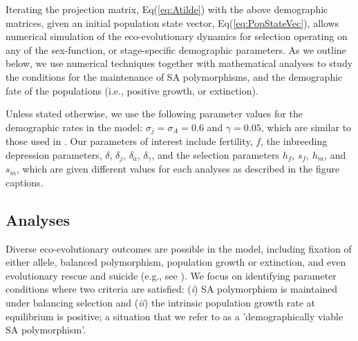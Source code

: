 \documentclass[11pt]{article}
\begin{document}
Iterating the projection matrix, Eq(\ref{eq:Atilde}) with the above demographic matrices, given an initial population state vector, Eq(\ref{eq:PopStateVec}), allows numerical simulation of the eco-evolutionary dynamics for selection operating on any of the sex-function, or stage-specific demographic parameters. As we outline below, we use numerical techniques together with mathematical analyses to study the conditions for the maintenance of SA polymorphisms, and the demographic fate of the populations (i.e., positive growth, or extinction).

Unless stated otherwise, we use the following parameter values for the demographic rates in the model: $\sigma_j = \sigma_A = 0.6$ and $\gamma = 0.05$, which are similar to those used in \citet{deVriesCaswell2019b}. Our parameters of interest include fertility, $f$, the inbreeding depression parameters, $\delta$, $\delta_j$, $\delta_a$, $\delta_{\gamma}$, and the selection parameters $h_f$, $s_f$, $h_m$, and $s_m$, which are given different values for each analyses as described in the figure captions.

\subsection*{Analyses} \label{sec:analyses}

Diverse eco-evolutionary outcomes are possible in the model, including fixation of either allele, balanced polymorphism, population growth or extinction, and even evolutionary rescue and suicide (e.g., see \citealt{CaswellEtAl2018,deVriesCaswell2019a,deVriesCaswell2019b}). We focus on identifying parameter conditions where two criteria are satisfied: ({\itshape i}) SA polymorphism is maintained under balancing selection and ({\itshape ii}) the intrinsic population growth rate at equilibrium is positive; a situation that we refer to as a 'demographically viable SA polymorphism'.
\end{document}
